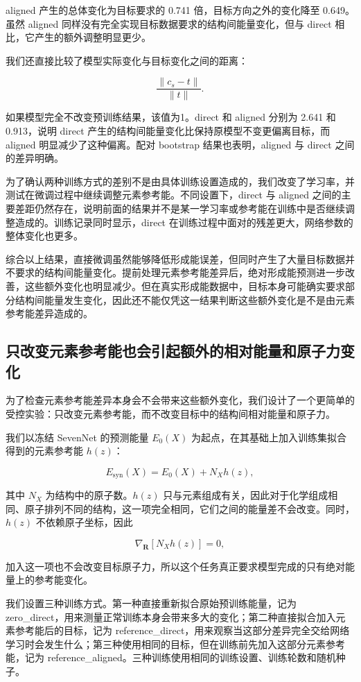 \documentclass[UTF8,a4paper,12pt,fontset=fandol]{ctexart}
\begin{document}
aligned 产生的总体变化为目标要求的 0.741 倍，目标方向之外的变化降至 0.649。虽然 aligned 同样没有完全实现目标数据要求的结构间能量变化，但与 direct 相比，它产生的额外调整明显更少。

我们还直接比较了模型实际变化与目标变化之间的距离：

\[
\frac{\|c_s-t\|}{\|t\|}.
\]

如果模型完全不改变预训练结果，该值为1。direct 和 aligned 分别为 2.641 和 0.913，说明 direct 产生的结构间能量变化比保持原模型不变更偏离目标，而 aligned 明显减少了这种偏离。配对 bootstrap 结果也表明，aligned 与 direct 之间的差异明确。

为了确认两种训练方式的差别不是由具体训练设置造成的，我们改变了学习率，并测试在微调过程中继续调整元素参考能。不同设置下，direct 与 aligned 之间的主要差距仍然存在，说明前面的结果并不是某一学习率或参考能在训练中是否继续调整造成的。训练记录同时显示，direct 在训练过程中面对的残差更大，网络参数的整体变化也更多。

综合以上结果，直接微调虽然能够降低形成能误差，但同时产生了大量目标数据并不要求的结构间能量变化。提前处理元素参考能差异后，绝对形成能预测进一步改善，这些额外变化也明显减少。但在真实形成能数据中，目标本身可能确实要求部分结构间能量发生变化，因此还不能仅凭这一结果判断这些额外变化是不是由元素参考能差异造成的。

\subsection{只改变元素参考能也会引起额外的相对能量和原子力变化}

为了检查元素参考能差异本身会不会带来这些额外变化，我们设计了一个更简单的受控实验：只改变元素参考能，而不改变目标中的结构间相对能量和原子力。

我们以冻结 SevenNet 的预测能量 \(E_0(X)\) 为起点，在其基础上加入训练集拟合得到的元素参考能 \(h(z)\)：

\[
E_{\mathrm{syn}}(X)
=
E_0(X)+N_Xh(z),
\]

其中 \(N_X\) 为结构中的原子数。\(h(z)\) 只与元素组成有关，因此对于化学组成相同、原子排列不同的结构，这一项完全相同，它们之间的能量差不会改变。同时，\(h(z)\) 不依赖原子坐标，因此

\[
\nabla_{\mathbf R}[N_Xh(z)]=0,
\]

加入这一项也不会改变目标原子力，所以这个任务真正要求模型完成的只有绝对能量上的参考能变化。

我们设置三种训练方式。第一种直接重新拟合原始预训练能量，记为 zero\_direct，用来测量正常训练本身会带来多大的变化；第二种直接拟合加入元素参考能后的目标，记为 reference\_direct，用来观察当这部分差异完全交给网络学习时会发生什么；第三种使用相同的目标，但在训练前先加入这部分元素参考能，记为 reference\_aligned。三种训练使用相同的训练设置、训练轮数和随机种子。
\end{document}
